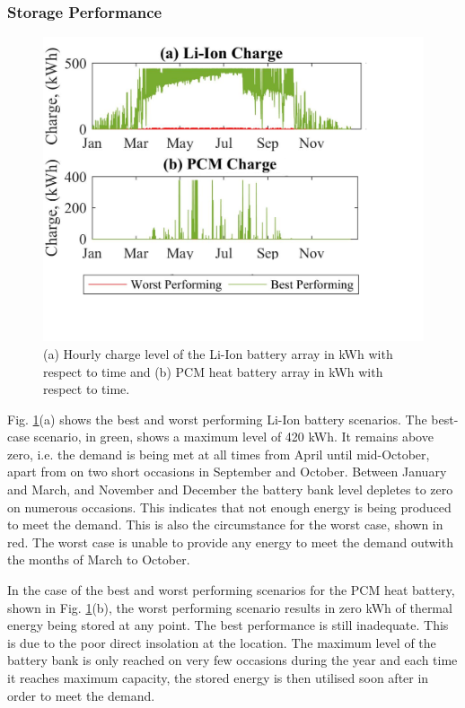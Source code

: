 \subsubsection{Storage Performance}

\begin{figure}[H]
	\centering
    \includegraphics[width=1.1\columnwidth]{Figures/StorageLevels.png}
    \vspace*{-15mm}
    \caption{(a) Hourly charge level of the Li-Ion battery array in kWh with respect to time and (b) PCM heat battery array in kWh with respect to time.}
    \label{fig:StorageLevels}
\end{figure}
  
Fig. \ref{fig:StorageLevels}(a) shows the best and worst performing Li-Ion battery scenarios. The best-case scenario, in green, shows a maximum level of 420 kWh. It remains above zero, i.e. the demand is being met at all times from April until mid-October, apart from on two short occasions in September and October. Between January and March, and November and December the battery bank level depletes to zero on numerous occasions. This indicates that not enough energy is being produced to meet the demand. This is also the circumstance for the worst case, shown in red. The worst case is unable to provide any energy to meet the demand outwith the months of March to October.
 
In the case of the best and worst performing scenarios for the PCM heat battery, shown in Fig. \ref{fig:StorageLevels}(b), the worst performing scenario results in zero kWh of thermal energy being stored at any point. The best performance is still inadequate. This is due to the poor direct insolation at the location. The maximum level of the battery bank is only reached on very few occasions during the year and each time it reaches maximum capacity, the stored energy is then utilised soon after in order to meet the demand.

